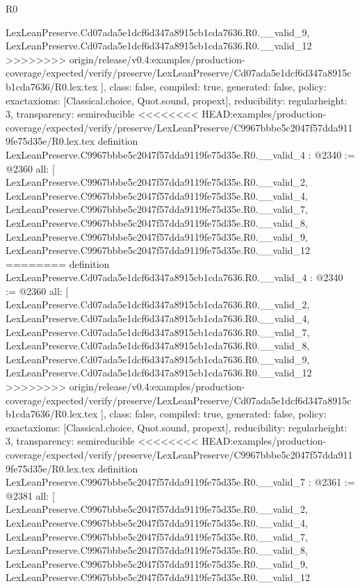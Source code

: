 \begin{lexlean}{R0}
\begin{coremodule}
{{{{{{{{{{{{{{{{{{{{{{{{{{{{{{{{{{{{{{{{{{{{{    LexLeanPreserve.Cd07ada5e1dcf6d347a8915cb1cda7636.R0.__valid_9,
    LexLeanPreserve.Cd07ada5e1dcf6d347a8915cb1cda7636.R0.__valid_12
>>>>>>>> origin/release/v0.4:examples/production-coverage/expected/verify/preserve/LexLeanPreserve/Cd07ada5e1dcf6d347a8915cb1cda7636/R0.lex.tex
  ],
  class: false,
  compiled: true,
  generated: false,
  policy: exact{axioms: [Classical.choice, Quot.sound, propext]},
  reducibility: regular{height: 3},
  transparency: semireducible
}
<<<<<<<< HEAD:examples/production-coverage/expected/verify/preserve/LexLeanPreserve/C9967bbbe5c2047f57dda9119fe75d35e/R0.lex.tex
definition LexLeanPreserve.C9967bbbe5c2047f57dda9119fe75d35e.R0.__valid_4 : @2340 := @2360 {
  all: [
    LexLeanPreserve.C9967bbbe5c2047f57dda9119fe75d35e.R0.__valid_2,
    LexLeanPreserve.C9967bbbe5c2047f57dda9119fe75d35e.R0.__valid_4,
    LexLeanPreserve.C9967bbbe5c2047f57dda9119fe75d35e.R0.__valid_7,
    LexLeanPreserve.C9967bbbe5c2047f57dda9119fe75d35e.R0.__valid_8,
    LexLeanPreserve.C9967bbbe5c2047f57dda9119fe75d35e.R0.__valid_9,
    LexLeanPreserve.C9967bbbe5c2047f57dda9119fe75d35e.R0.__valid_12
========
definition LexLeanPreserve.Cd07ada5e1dcf6d347a8915cb1cda7636.R0.__valid_4 : @2340 := @2360 {
  all: [
    LexLeanPreserve.Cd07ada5e1dcf6d347a8915cb1cda7636.R0.__valid_2,
    LexLeanPreserve.Cd07ada5e1dcf6d347a8915cb1cda7636.R0.__valid_4,
    LexLeanPreserve.Cd07ada5e1dcf6d347a8915cb1cda7636.R0.__valid_7,
    LexLeanPreserve.Cd07ada5e1dcf6d347a8915cb1cda7636.R0.__valid_8,
    LexLeanPreserve.Cd07ada5e1dcf6d347a8915cb1cda7636.R0.__valid_9,
    LexLeanPreserve.Cd07ada5e1dcf6d347a8915cb1cda7636.R0.__valid_12
>>>>>>>> origin/release/v0.4:examples/production-coverage/expected/verify/preserve/LexLeanPreserve/Cd07ada5e1dcf6d347a8915cb1cda7636/R0.lex.tex
  ],
  class: false,
  compiled: true,
  generated: false,
  policy: exact{axioms: [Classical.choice, Quot.sound, propext]},
  reducibility: regular{height: 3},
  transparency: semireducible
}
<<<<<<<< HEAD:examples/production-coverage/expected/verify/preserve/LexLeanPreserve/C9967bbbe5c2047f57dda9119fe75d35e/R0.lex.tex
definition LexLeanPreserve.C9967bbbe5c2047f57dda9119fe75d35e.R0.__valid_7 : @2361 := @2381 {
  all: [
    LexLeanPreserve.C9967bbbe5c2047f57dda9119fe75d35e.R0.__valid_2,
    LexLeanPreserve.C9967bbbe5c2047f57dda9119fe75d35e.R0.__valid_4,
    LexLeanPreserve.C9967bbbe5c2047f57dda9119fe75d35e.R0.__valid_7,
    LexLeanPreserve.C9967bbbe5c2047f57dda9119fe75d35e.R0.__valid_8,
    LexLeanPreserve.C9967bbbe5c2047f57dda9119fe75d35e.R0.__valid_9,
    LexLeanPreserve.C9967bbbe5c2047f57dda9119fe75d35e.R0.__valid_12
}}}}}}}}}}}}}}}}}}}}}}}}}}}}}}}}}}}}}}}}}}}}}}
\end{coremodule}
\end{lexlean}
